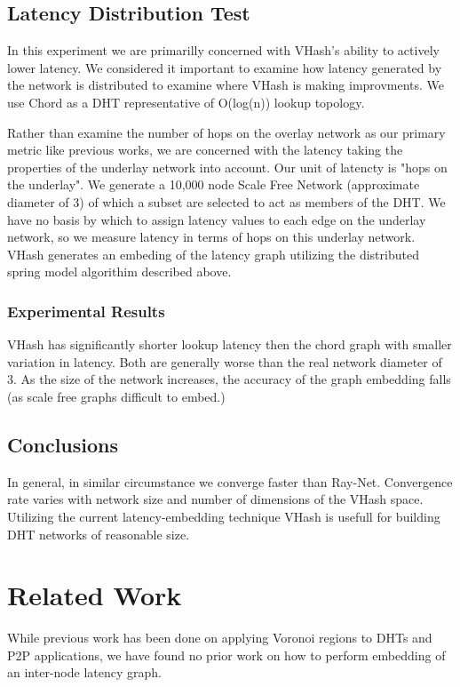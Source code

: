 \documentclass{IEEEtran}
\begin{document}
\subsection{Latency Distribution Test}
In this experiment we are primarilly concerned with VHash's ability to actively lower latency.
We considered it important to examine how latency generated by the network is distributed to examine where VHash is making improvments.
We use Chord as a DHT representative of O(log(n)) lookup topology.

Rather than examine the number of hops on the overlay network as our primary metric like previous works, we are concerned with the latency taking the properties of the underlay network into account.
Our unit of latencty is "hops on the underlay".
We generate a 10,000 node Scale Free Network (approximate diameter of 3) of which a subset are selected to act as members of the DHT.
We have no basis by which to assign latency values to each edge on the underlay network, so we measure latency in terms of hops on this underlay network.
VHash generates an embeding of the latency graph utilizing the distributed spring model algorithim described above.

\subsubsection{Experimental Results}
VHash has significantly shorter lookup latency then the chord graph with smaller variation in latency.
Both are generally worse than the real network diameter of 3.
As the size of the network increases, the accuracy of the graph embedding falls (as scale free graphs difficult to embed.)

\subsection{Conclusions}
In general, in similar circumstance we converge faster than Ray-Net.
Convergence rate varies with network size and number of dimensions of the VHash space.
Utilizing the current latency-embedding technique VHash is usefull for building DHT networks of reasonable size.

\section{Related Work}
While previous work has been done on applying Voronoi regions to DHTs and P2P applications, we have found no prior work on how to perform embedding of an inter-node latency graph.   
\end{document}
